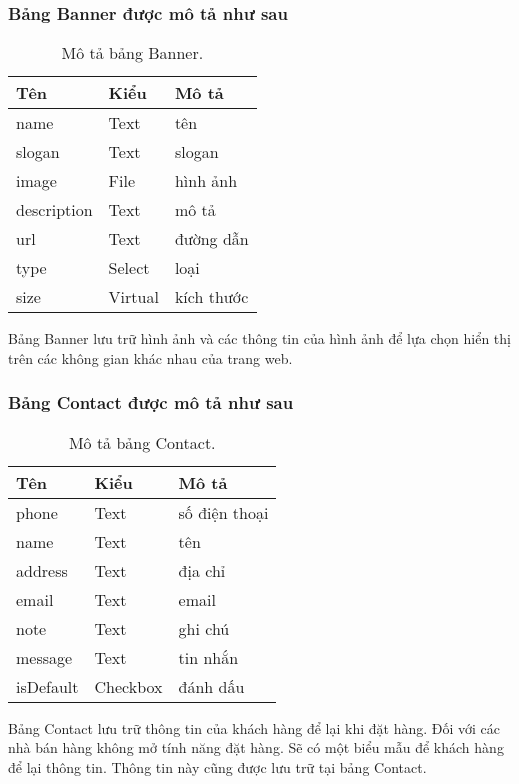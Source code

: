 \subsubsection{Bảng Banner được mô tả như sau}
\begin{table}[!htbp]\fontsize{13px}{13px}\selectfont\justifying
\begin{center}
\caption{Mô tả bảng Banner.}
\begin{tabularx}{0.6\textwidth}{ |l|l|X| } 
\hline
Tên & Kiểu & Mô tả \\
\hline
name & Text & tên \\
slogan & Text & slogan \\
image & File & hình ảnh \\
description & Text & mô tả \\
url & Text & đường dẫn \\
type & Select & loại \\
size & Virtual & kích thước \\ 
\hline
\end{tabularx}
\label{table:Banner}
\end{center}
Bảng Banner lưu trữ hình ảnh và các thông tin của hình ảnh để lựa chọn hiển thị trên các không gian khác nhau của trang web.
\end{table}

\subsubsection{Bảng Contact được mô tả như sau}
\begin{table}[!htbp]\fontsize{13px}{13px}\selectfont\justifying
\begin{center}
\caption{Mô tả bảng Contact.}
\begin{tabularx}{0.6\textwidth}{ |l|l|X| } 
\hline
Tên & Kiểu & Mô tả \\
\hline
phone & Text & số điện thoại \\
name & Text & tên \\
address & Text & địa chỉ \\
email & Text & email \\
note & Text & ghi chú \\
message & Text & tin nhắn \\
isDefault & Checkbox & đánh dấu \\ 
\hline
\end{tabularx}
\label{table:Contact}
\end{center}
Bảng Contact lưu trữ thông tin của khách hàng để lại khi đặt hàng. Đối với các nhà bán hàng không mở tính năng đặt hàng. Sẽ có một biểu mẫu để khách hàng để lại thông tin. Thông tin này cũng được lưu trữ tại bảng Contact.
\end{table}
\clearpage
